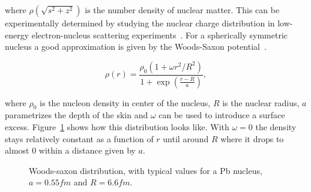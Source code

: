 \noindent where $ \rho\left(\sqrt{s^2+z^2}\right)$ is the number density of nuclear matter. This can be experimentally determined by studying the nuclear charge distribution in low-energy electron-nucleus scattering experiments~\cite{Miller:2007ri,DeJager:1987qc}. For a spherically symmetric nucleus a good approximation is given by the Woods-Saxon potential~\cite{Abelev:2013qoq}. 

\begin{equation}
\rho\left( r\right) = \frac{\rho_0 \left(1+\omega r^2 / R^2\right)}{1+\exp \left(\frac{r-R}{a}\right)},
\end{equation}


\noindent where $\rho_0$ is the nucleon density in center of the nucleus, $R$ is the nuclear radius, $a$ parametrizes the depth of the skin and $\omega$ can be used to introduce a surface excess. Figure~\ref{fig:woodssaxon} shows how this distribution looks like. With $\omega=0$ the density stays relatively constant as a function of $r$ until around $R$ where it drops to almost 0 within a distance given by $a$. 

\begin{figure}
\centering
{}
\caption{Woods-saxon distribution, with typical values for a Pb nucleus, $a=0.55\unit{fm}$ and $R=6.6\unit{fm}$.}
\label{fig:woodssaxon}
\end{figure}


